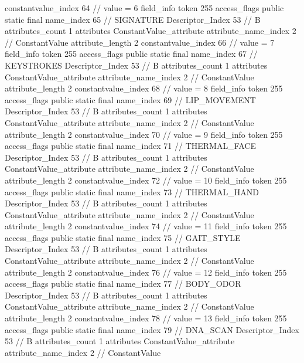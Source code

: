 {{{{{{{					constantvalue_index	64		// value = 6
				}
				}
			}
			field_info {
				token	255
				access_flags	public static final
				name_index	65		// SIGNATURE
				Descriptor_Index	53		// B
				attributes_count	1
				attributes {
				ConstantValue_attribute {
					attribute_name_index	2		// ConstantValue
					attribute_length	2
					constantvalue_index	66		// value = 7
				}
				}
			}
			field_info {
				token	255
				access_flags	public static final
				name_index	67		// KEYSTROKES
				Descriptor_Index	53		// B
				attributes_count	1
				attributes {
				ConstantValue_attribute {
					attribute_name_index	2		// ConstantValue
					attribute_length	2
					constantvalue_index	68		// value = 8
				}
				}
			}
			field_info {
				token	255
				access_flags	public static final
				name_index	69		// LIP_MOVEMENT
				Descriptor_Index	53		// B
				attributes_count	1
				attributes {
				ConstantValue_attribute {
					attribute_name_index	2		// ConstantValue
					attribute_length	2
					constantvalue_index	70		// value = 9
				}
				}
			}
			field_info {
				token	255
				access_flags	public static final
				name_index	71		// THERMAL_FACE
				Descriptor_Index	53		// B
				attributes_count	1
				attributes {
				ConstantValue_attribute {
					attribute_name_index	2		// ConstantValue
					attribute_length	2
					constantvalue_index	72		// value = 10
				}
				}
			}
			field_info {
				token	255
				access_flags	public static final
				name_index	73		// THERMAL_HAND
				Descriptor_Index	53		// B
				attributes_count	1
				attributes {
				ConstantValue_attribute {
					attribute_name_index	2		// ConstantValue
					attribute_length	2
					constantvalue_index	74		// value = 11
				}
				}
			}
			field_info {
				token	255
				access_flags	public static final
				name_index	75		// GAIT_STYLE
				Descriptor_Index	53		// B
				attributes_count	1
				attributes {
				ConstantValue_attribute {
					attribute_name_index	2		// ConstantValue
					attribute_length	2
					constantvalue_index	76		// value = 12
				}
				}
			}
			field_info {
				token	255
				access_flags	public static final
				name_index	77		// BODY_ODOR
				Descriptor_Index	53		// B
				attributes_count	1
				attributes {
				ConstantValue_attribute {
					attribute_name_index	2		// ConstantValue
					attribute_length	2
					constantvalue_index	78		// value = 13
				}
				}
			}
			field_info {
				token	255
				access_flags	public static final
				name_index	79		// DNA_SCAN
				Descriptor_Index	53		// B
				attributes_count	1
				attributes {
				ConstantValue_attribute {
					attribute_name_index	2		// ConstantValue
}}}}}}}
